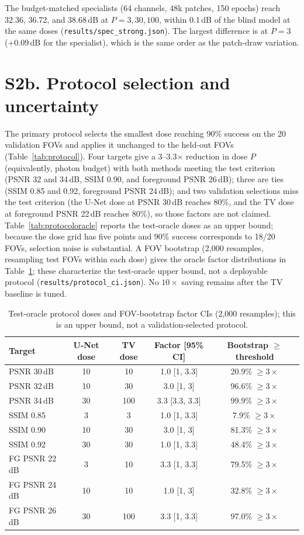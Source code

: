 \documentclass[11pt]{article}
\begin{document}
The budget-matched specialists (64 channels, 48k patches, 150 epochs) reach
32.36, 36.72, and 38.68\,dB at $P=3,30,100$, within 0.1\,dB of the blind model
at the same doses (\texttt{results/spec\_strong.json}). The largest difference
is at $P=3$ (+0.09\,dB for the specialist), which is the same order as the
patch-draw variation.

\section*{S2b. Protocol selection and uncertainty}
The primary protocol selects the smallest dose reaching 90\% success on the 20
validation FOVs and applies it unchanged to the held-out FOVs
(Table~\ref{tab:protocol}). Four targets give a 3--3.3$\times$ reduction in
dose $P$ (equivalently, photon budget) with both methods meeting the test
criterion (PSNR 32 and 34\,dB, SSIM 0.90,
and foreground PSNR 26\,dB); three are ties (SSIM 0.85 and 0.92, foreground
PSNR 24\,dB); and two validation selections miss the test criterion (the U-Net
dose at PSNR 30\,dB reaches 80\%, and the TV dose at foreground PSNR 22\,dB
reaches 80\%), so those factors are not claimed. Table~\ref{tab:protocoloracle}
reports the test-oracle doses as an upper bound; because the dose grid has five
points and 90\% success corresponds to 18/20 FOVs, selection noise is
substantial. A FOV bootstrap (2,000 resamples, resampling test FOVs within each
dose) gives the oracle factor distributions in Table~\ref{tab:protocolci};
these characterize the test-oracle upper bound, not a deployable protocol
(\texttt{results/protocol\_ci.json}). No $10\times$ saving remains after the TV
baseline is tuned.

\begin{table}[h]
\centering
\caption{Test-oracle protocol doses and FOV-bootstrap factor CIs (2,000
resamples); this is an upper bound, not a validation-selected protocol.}
\label{tab:protocolci}
\small
\begin{tabular}{lcccc}
\toprule
Target & U-Net dose & TV dose & Factor [95\% CI] & Bootstrap $\geq$ threshold \\
\midrule
PSNR 30\,dB & 10 & 10 & 1.0 [1, 3.3] & 20.9\% $\geq3\times$ \\
PSNR 32\,dB & 10 & 30 & 3.0 [1, 3] & 96.6\% $\geq3\times$ \\
PSNR 34\,dB & 30 & 100 & 3.3 [3.3, 3.3] & 99.9\% $\geq3\times$ \\
SSIM 0.85 & 3 & 3 & 1.0 [1, 3.3] & 7.9\% $\geq3\times$ \\
SSIM 0.90 & 10 & 30 & 3.0 [1, 3] & 81.3\% $\geq3\times$ \\
SSIM 0.92 & 30 & 30 & 1.0 [1, 3.3] & 48.4\% $\geq3\times$ \\
FG PSNR 22\,dB & 3 & 10 & 3.3 [1, 3.3] & 79.5\% $\geq3\times$ \\
FG PSNR 24\,dB & 10 & 10 & 1.0 [1, 3] & 32.8\% $\geq3\times$ \\
FG PSNR 26\,dB & 30 & 100 & 3.3 [1, 3.3] & 97.0\% $\geq3\times$ \\
\bottomrule
\end{tabular}
\end{table}
\end{document}
